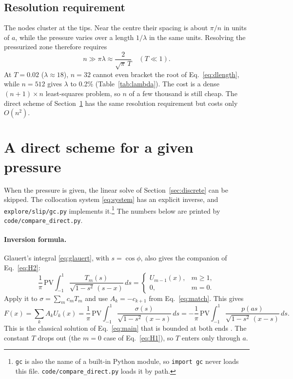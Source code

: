 \documentclass[12pt]{article}
\newcommand{\PV}{\mathrm{PV}\!\!}
\begin{document}
\subsection{Resolution requirement}\label{sec:resolution}
The nodes cluster at the tips. Near the centre their spacing is about $\pi/n$ in
units of $a$, while the pressure varies over a length $1/\lambda$ in the same
units. Resolving the pressurized zone therefore requires
\begin{equation*}
	n \gg \pi\lambda \approx \frac{2}{\sqrt\pi\,T} \quad (T\ll1).
\end{equation*}
At $T=0.02$ ($\lambda\approx18$), $n=32$ cannot even bracket the root of
Eq.~\eqref{eq:dlength}, while $n=512$ gives $\lambda$ to 0.2\%
(Table~\ref{tab:lambda}). The cost is a dense $(n+1)\times n$ least-squares
problem, so $n$ of a few thousand is still cheap. The direct scheme of
Section~\ref{sec:direct} has the same resolution requirement but costs only
$O(n^2)$.

\section{A direct scheme for a given pressure}\label{sec:direct}

When the pressure is given, the linear solve of Section~\ref{sec:discrete} can
be skipped. The collocation system \eqref{eq:system} has an explicit inverse,
and \texttt{explore/slip/gc.py} implements it.\footnote{\raggedright\texttt{gc} is also the
	name of a built-in Python module, so \texttt{import gc} never loads this file.
	\texttt{code/compare\_direct.py} loads it by path.} The numbers below are
printed by \texttt{code/compare\_direct.py}.

\paragraph{Inversion formula.} Glauert's integral \eqref{eq:glauert}, with
$s=\cos\phi$, also gives the companion of Eq.~\eqref{eq:H2}:
\begin{equation}\label{eq:H1}
	\frac1\pi\,\PV\int_{-1}^{1}\frac{T_m(s)}{\sqrt{1-s^2}\,(s-x)}\,ds =
	\begin{cases} U_{m-1}(x), & m\ge1,\\ 0, & m=0. \end{cases}
\end{equation}
Apply it to $\sigma = \sum_m c_mT_m$ and use $A_k = -c_{k+1}$ from
Eq.~\eqref{eq:match}. This gives
\begin{equation}\label{eq:inverse}
	F(x) = \sum_k A_k U_k(x)
	= \frac1\pi\,\PV\int_{-1}^{1}\frac{\sigma(s)}{\sqrt{1-s^2}\,(x-s)}\,ds
	= -\frac1\pi\,\PV\int_{-1}^{1}\frac{p(as)}{\sqrt{1-s^2}\,(x-s)}\,ds .
\end{equation}
This is the classical solution of Eq.~\eqref{eq:main} that is bounded at both
ends \parencite{Muskhelishvili1953}. The constant $T$ drops out (the $m=0$ case
of Eq.~\ref{eq:H1}), so $T$ enters only through $a$.
\end{document}
